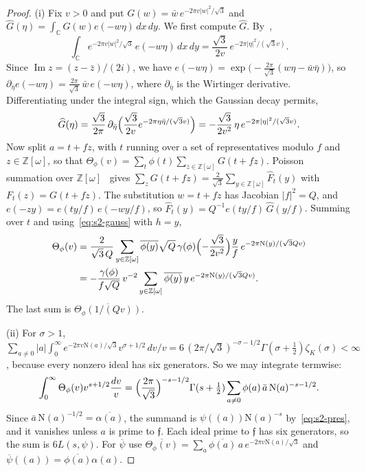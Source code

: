 \documentclass[11pt]{article}
\numberwithin{equation}{section}
\newcommand{\OO}{\mathbb Z[\omega]}
\newcommand{\N}{\mathrm N}
\begin{document}
\begin{proof}
(i) Fix $v>0$ and put $G(w)=\bar w\,e^{-2\pi v|w|^2/\sqrt3}$ and
$\widehat G(\eta)=\int_{\mathbb C}G(w)e(-w\eta)\,dx\,dy$. We first compute $\widehat G$. By~\cite[Example~20]{QF},
\begin{equation}\label{eq:d151}
 \int_{\mathbb C}e^{-2\pi v|w|^2/\sqrt3}\,e(-w\eta)\,dx\,dy=\frac{\sqrt3}{2v}\,e^{-2\pi|\eta|^2/(\sqrt3v)} .
\end{equation}
Since $\operatorname{Im}z=(z-\bar z)/(2i)$, we have $e(-w\eta)=\exp\bigl(-\frac{2\pi}{\sqrt3}(w\eta-\bar w\bar\eta)\bigr)$, so
$\partial_{\bar\eta}e(-w\eta)=\frac{2\pi}{\sqrt3}\,\bar w\,e(-w\eta)$, where $\partial_{\bar\eta}$ is the Wirtinger
derivative. Differentiating under the integral sign, which the Gaussian decay permits,
\begin{equation}\label{eq:d152}
 \widehat G(\eta)=\frac{\sqrt3}{2\pi}\,\partial_{\bar\eta}\Bigl(\frac{\sqrt3}{2v}e^{-2\pi\eta\bar\eta/(\sqrt3v)}\Bigr)
 =-\frac{\sqrt3}{2v^2}\,\eta\,e^{-2\pi|\eta|^2/(\sqrt3v)} .
\end{equation}
Now split $a=t+fz$, with $t$ running over a set of representatives modulo $f$ and $z\in\OO$, so that
$\Theta_\phi(v)=\sum_t\phi(t)\sum_{z\in\OO}G(t+fz)$. Poisson summation over $\OO$~\cite[Theorem~19]{QF} gives
$\sum_zG(t+fz)=\frac2{\sqrt3}\sum_{y\in\OO}\widehat F_t(y)$ with $F_t(z)=G(t+fz)$. The substitution $w=t+fz$ has
Jacobian $|f|^2=Q$, and $e(-zy)=e(ty/f)\,e(-wy/f)$, so
$\widehat F_t(y)=Q^{-1}e(ty/f)\,\widehat G(y/f)$. Summing over $t$ and using~\eqref{eq:s2-gauss} with $h=y$,
\begin{equation}\label{eq:d153}
\begin{split}
 \Theta_\phi(v)&=\frac2{\sqrt3\,Q}\sum_{y\in\OO}\overline{\phi(y)}\sqrt Q\,\gamma(\phi)
 \Bigl(-\frac{\sqrt3}{2v^2}\Bigr)\frac yf\,e^{-2\pi\N(y)/(\sqrt3Qv)}\\
 &=-\frac{\gamma(\phi)}{f\sqrt Q}\,v^{-2}\sum_{y\in\OO}\overline{\phi(y)}\,y\,e^{-2\pi\N(y)/(\sqrt3Qv)} .
\end{split}
\end{equation}
The last sum is $\overline{\Theta_\phi(1/(Qv))}$.

(ii) For $\sigma>1$,
$\sum_{a\ne0}|a|\int_0^\infty e^{-2\pi v\N(a)/\sqrt3}v^{\sigma+1/2}\,dv/v
=6\,(2\pi/\sqrt3)^{-\sigma-1/2}\Gamma(\sigma+\frac12)\zeta_K(\sigma)<\infty$, because every nonzero ideal has six
generators. So we may integrate termwise:
\begin{equation}\label{eq:d154}
 \int_0^\infty\Theta_\phi(v)v^{s+1/2}\frac{dv}v
 =\Bigl(\frac{2\pi}{\sqrt3}\Bigr)^{-s-1/2}\Gamma(s+\tfrac12)\sum_{a\ne0}\phi(a)\,\bar a\,\N(a)^{-s-1/2}.
\end{equation}
Since $\bar a\,\N(a)^{-1/2}=\overline{\alpha(a)}$, the summand is $\psi((a))\N(a)^{-s}$ by~\eqref{eq:s2-pres}, and
it vanishes unless $a$ is prime to $\mathfrak f$. Each ideal prime to $\mathfrak f$ has six generators, so the sum
is $6L(s,\psi)$. For $\overline\psi$ use $\overline{\Theta_\phi(v)}=\sum_a\overline{\phi(a)}\,a\,e^{-2\pi v\N(a)/\sqrt3}$
and $\overline\psi((a))=\overline{\phi(a)}\alpha(a)$.


\end{proof}
\end{document}
